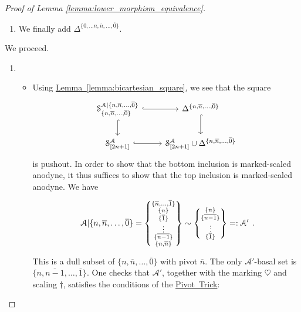 \documentclass[main.tex]{subfiles}
\begin{document}
\begin{proof}[Proof of Lemma \ref{lemma:lower_morphism_equivalence}]
\begin{enumerate}
    \item We finally add $\Delta^{\{0, \ldots n, \overline{n}, \ldots, \overline{0}\}}$.
  \end{enumerate}
  We proceed.
  \begin{enumerate}
    \item
      \begin{itemize}
        \item Using \hyperref[lemma:bicartesian_square]{Lemma~\ref*{lemma:bicartesian_square}}, we see that the square
          \begin{equation*}
            \begin{tikzcd}
              \S^{\mathcal{A}|\{n, \overline{n}, \ldots, \overline{0}\}}_{\{n, \overline{n}, \ldots, \overline{0}\}}
              \arrow[r, hook]
              \arrow[d, hook]
              & \Delta^{\{n, \overline{n}, \ldots, \overline{0}\}}
              \arrow[d, hook]
              \\
              \S^{\mathcal{A}}_{[2n+1]}
              \arrow[r, hook]
              & \S^{\mathcal{A}}_{[2n+1]} \cup \Delta^{\{n, \overline{n}, \ldots, \overline{0}\}}
            \end{tikzcd}
          \end{equation*}
          is pushout. In order to show that the bottom inclusion is marked-scaled anodyne, it thus suffices to show that the top inclusion is marked-scaled anodyne. We have
          \begin{equation*}
            \begin{tikzcd}
              \mathcal{A}|\{n, \overline{n}, \ldots, \overline{0}\}
              = \left\{ \substack{ \{\overline{n}, \ldots, \overline{1}\} \\ \{n\} \\ \{\overline{1}\} \\ \vdots \\ \{\overline{n-1}\} \\ \{n, \overline{n}\} } \right\}
              \sim \left\{ \substack{ \{n\} \\ \{\overline{n-1}\} \\ \vdots \\ \{\overline{1}\} } \right\} =: \mathcal{A}'
            \end{tikzcd}.
          \end{equation*}
          This is a dull subset of $\{n, \overline{n}, \ldots, \overline{0}\}$ with pivot $\overline{n}$. The only $\mathcal{A}'$-basal set is $\{n, \overline{n-1}, \ldots, \overline{1}\}$. One checks that $\mathcal{A}'$, together with the marking $\heartsuit$ and scaling $\dagger$, satisfies the conditions of the \hyperref[lemma:pivot_trick]{Pivot~Trick}:

\end{itemize}
\end{enumerate}
\end{proof}
\end{document}
